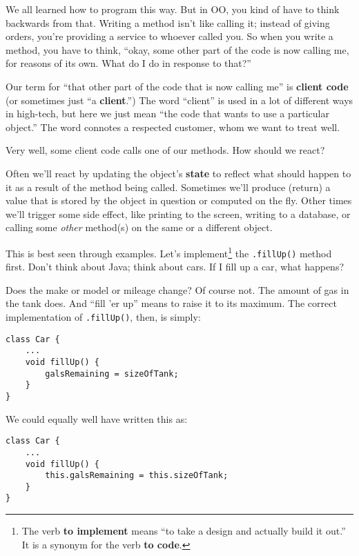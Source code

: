 We all learned how to program this way. But in OO, you kind of have to think
backwards from that. Writing a method isn't like calling it; instead of giving
orders, you're providing a service to whoever called you. So when you write a
method, you have to think, ``okay, some other part of the code is now calling
me, for reasons of its own. What do I do in response to that?''

Our term for ``that other part of the code that is now calling me'' is
\textbf{client code} (or sometimes just ``a \textbf{client}.'') The word
``client'' is used in a lot of different ways in high-tech, but here we just
mean ``the code that wants to use a particular object.'' The word connotes a
respected customer, whom we want to treat well.

Very well, some client code calls one of our methods. How should we react?

Often we'll react by updating the object's \textbf{state} to reflect what
should happen to it as a result of the method being called. Sometimes we'll
produce (return) a value that is stored by the object in question or
computed on the fly. Other times we'll trigger some side effect, like printing
to the screen, writing to a database, or calling some \textit{other} method(s)
on the same or a different object.

\pagebreak
{}
This is best seen through examples. Let's implement\footnote{The verb
\textbf{to implement} means ``to take a design and actually build it out.'' It
is a synonym for the verb \textbf{to code}.} the \texttt{.fillUp()} method
first. Don't think about Java; think about cars. If I fill up a car, what
happens?

Does the make or model or mileage change? Of course not. The amount of gas in
the tank does. And ``fill 'er up'' means to raise it to its maximum. The
correct implementation of \texttt{.fillUp()}, then, is simply:

\begin{Verbatim}[samepage=true,fontsize=\scriptsize,frame=single]
class Car {
    ...
    void fillUp() {
        galsRemaining = sizeOfTank;
    }
}
\end{Verbatim}

We could equally well have written this as:

\begin{Verbatim}[samepage=true,fontsize=\scriptsize,frame=single]
class Car {
    ...
    void fillUp() {
        this.galsRemaining = this.sizeOfTank;
    }
}
\end{Verbatim}


